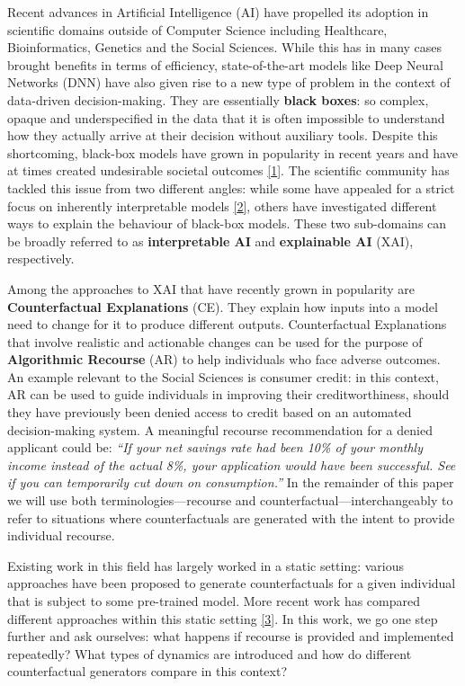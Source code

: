 \documentclass[conference,final,]{IEEEtran}
\theoremstyle{definition}
\theoremstyle{definition}
\theoremstyle{definition}
\theoremstyle{definition}
\theoremstyle{remark}
\begin{document}
Recent advances in Artificial Intelligence (AI) have propelled its adoption in scientific domains outside of Computer Science including Healthcare, Bioinformatics, Genetics and the Social Sciences. While this has in many cases brought benefits in terms of efficiency, state-of-the-art models like Deep Neural Networks (DNN) have also given rise to a new type of problem in the context of data-driven decision-making. They are essentially \textbf{black boxes}: so complex, opaque and underspecified in the data that it is often impossible to understand how they actually arrive at their decision without auxiliary tools. Despite this shortcoming, black-box models have grown in popularity in recent years and have at times created undesirable societal outcomes \protect\hyperlink{ref-oneil2016weapons}{{[}1{]}}. The scientific community has tackled this issue from two different angles: while some have appealed for a strict focus on inherently interpretable models \protect\hyperlink{ref-rudin2019stop}{{[}2{]}}, others have investigated different ways to explain the behaviour of black-box models. These two sub-domains can be broadly referred to as \textbf{interpretable AI} and \textbf{explainable AI} (XAI), respectively.

Among the approaches to XAI that have recently grown in popularity are \textbf{Counterfactual Explanations} (CE). They explain how inputs into a model need to change for it to produce different outputs. Counterfactual Explanations that involve realistic and actionable changes can be used for the purpose of \textbf{Algorithmic Recourse} (AR) to help individuals who face adverse outcomes. An example relevant to the Social Sciences is consumer credit: in this context, AR can be used to guide individuals in improving their creditworthiness, should they have previously been denied access to credit based on an automated decision-making system. A meaningful recourse recommendation for a denied applicant could be: \emph{``If your net savings rate had been 10\% of your monthly income instead of the actual 8\%, your application would have been successful. See if you can temporarily cut down on consumption.''} In the remainder of this paper we will use both terminologies---recourse and counterfactual---interchangeably to refer to situations where counterfactuals are generated with the intent to provide individual recourse.

Existing work in this field has largely worked in a static setting: various approaches have been proposed to generate counterfactuals for a given individual that is subject to some pre-trained model. More recent work has compared different approaches within this static setting \protect\hyperlink{ref-pawelczyk2021carla}{{[}3{]}}. In this work, we go one step further and ask ourselves: what happens if recourse is provided and implemented repeatedly? What types of dynamics are introduced and how do different counterfactual generators compare in this context?
\end{document}
